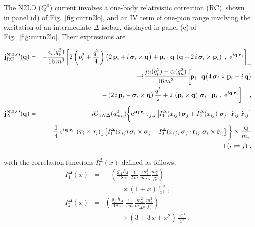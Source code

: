 \documentclass[aps,prc,floatfix,showpacs,twocolumn, preprintnumbers]{revtex4-2}
\begin{document}
The N2LO ($Q^{0}$) current involves a one-body relativistic correction (RC), shown in panel (d) of Fig.~\ref{fig:currn2lo}, and an IV term of one-pion range involving the excitation of an intermediate $\Delta$-isobar, displayed in panel (e) of Fig.~\ref{fig:currn2lo}. Their expressions are 
\begin{widetext}
\begin{eqnarray}
\label{eq:j1rcc}
{\bf j}^{\rm N2LO}_{\rm RC}({\bf q})&=&-\frac{\epsilon_i(q_{\mu}^2)}{16 \, m^3}
 \left[2 \left( p_i^2 +\frac{q^2}{4} \right)  \big( 2\, {\bf p}_i
+i\, {\bm \sigma}_i\times {\bf q } \big) 
+ {\bf p}_i\cdot {\bf q}\, \left({\bf q} +2\, i\, {\bm \sigma}_i\times {\bf p }_i \right)
 \,\, ,\,\, 
 {\rm e}^{i {\bf q}\cdot {\bf r}_i}\right]_{+}\nonumber \\
 && \hspace{-0.2cm} - i\, \frac{\mu_i(q_{\mu}^2)-\epsilon_i(q_{\mu}^2)}{16 \, m^3}
  \bigg[ {\bf p}_i\cdot {\bf q} \big( 4\, {\bm \sigma}_i\times {\bf p}_i-i\, {\bf q}\big) \nonumber \\
 &&\left. - \left(  2\, i\, {\bf p}_i -{\bm \sigma}_i\times {\bf q} \right)\frac{q^2}{2}  +2\, \left({\bf p}_i\times {\bf q}\right)
 \, {\bm \sigma}_i\cdot {\bf p}_i
 \,\, , \,\, {\rm e}^{i {\bf q}\cdot {\bf r}_i}\right]_{+}  \ , \\
{\bf j}^{\rm N2LO}_{\Delta}({\bf q})&=&-iG_{\gamma N \Delta}(q_{mu}^2)\bigg\{ {\rm e}^{i {\bf q}\cdot {\bf r}_i} \, \tau_{j,z}
\left[ I^{\Delta}_1(x_{ij}) \, {\bm \sigma}_j
+I_{2}^{\Delta}(x_{ij}) \,\,
 {\bm \sigma}_j\cdot \hat{\bf r}_{ij} \,\, \hat{\bf r}_{ij}\right] \nonumber\\
&&- \frac{1}{4}\, {\rm e}^{i\, {\bf q}\cdot {\bf r}_i}\, \left({\bm \tau}_i\times{\bm \tau}_j\right)_z \left[
I^{\Delta}_1 (x_{ij})\, {\bm \sigma}_i \times {\bm \sigma}_j
+I^\Delta_2(x_{ij})\, {\bm \sigma}_j\cdot \hat{\bf r}_{ij}\,\, {\bm \sigma}_i\times \hat{\bf r}_{ij}\right]\bigg\} \times\frac{{\bf q}}{m_\pi} \nonumber \\
&& +(i\rightleftharpoons j )\ , \label{eq:jdn2lo}
\end{eqnarray}
\end{widetext}
with the correlation functions $I^\Delta_k(x)$ defined as follows,
\begin{eqnarray}
\label{eq:e13}
I^\Delta_1(x)&=&- \left(\frac{g_A\,h_A}{18\, \pi}\,
\frac{1}{2\, m}\, \frac{m_\pi^2}{m_{\Delta N}}
 \frac{m_\pi^2}{f_\pi^2}\right) \nonumber \\
 &&\hspace{1cm} \times (1+x)\, \frac{e^{-x}}{x^3} \ , \\
\label{eq:e14}
I^\Delta_2(x)&=&\left(\frac{g_A\,h_A}{18\, \pi}\,
\frac{1}{2\, m}\, \frac{m_\pi^2}{m_{\Delta N}}
 \frac{m_\pi^2}{f_\pi^2}\right) \nonumber \\
&&\hspace{1cm} \times (3+3\,x+x^2)\, \frac{e^{-x}}{x^3} \ ,
\end{eqnarray}
\end{document}

